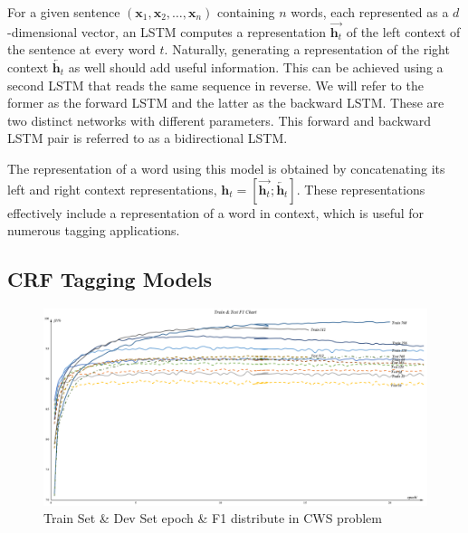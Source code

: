 For a given sentence $(\mathbf{x}_1, \mathbf{x}_2, \ldots, \mathbf{x}_n)$ containing $n$ words, each represented as a $d$-dimensional vector, an LSTM computes a representation $\overrightarrow{\mathbf{h}_t}$ of the left context of the sentence at every word $t$. Naturally, generating a representation of the right context $\overleftarrow{\mathbf{h}_t}$ as well should add useful information. This can be achieved using a second LSTM that reads the same sequence in reverse. We will refer to the former as the forward LSTM and the latter as the backward LSTM. These are two distinct networks with different parameters. This forward and backward LSTM pair is referred to as a bidirectional LSTM.

The representation of a word using this model is obtained by concatenating its left and right context representations, $\mathbf{h}_{t} = [\overrightarrow{\mathbf{h}_{t}} ; \overleftarrow{\mathbf{h}_{t}}]$. These representations effectively include a representation of a word in context, which is useful for numerous tagging applications.

\subsection{CRF Tagging Models}
\label{sec:crf}

\begin{figure}[t]
    \begin{center}
        \includegraphics[width=\textwidth]{figures/batch.pdf}
    \end{center}
    \caption{Train Set \& Dev Set epoch \& F1 distribute in CWS problem}
    \label{fig:batch}
\end{figure}


